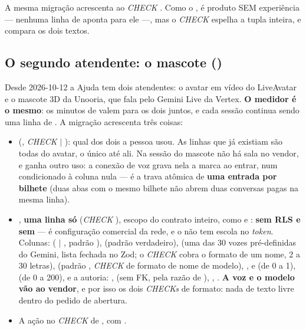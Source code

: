 A mesma migração acrescenta  ao \emph{CHECK}
. Como o , é produto SEM
experiência --- nenhuma linha de  aponta para ele ---, mas o
\emph{CHECK} espelha a tupla  inteira, e
 compara os dois textos.

\subsection{O segundo atendente: o mascote ()}

Desde 2026-10-12 a Ajuda tem dois atendentes: o avatar em vídeo do LiveAvatar e
o mascote 3D da Unooria, que fala pelo Gemini Live da Vertex. \textbf{O medidor é
o mesmo}: os minutos de  valem para os dois juntos, e cada
sessão continua sendo uma linha de . A migração
 acrescenta três coisas:

\begin{itemize}
  \item \textbf{} (, \emph{CHECK}  $|$ ): qual dos dois a
    pessoa usou. As linhas que já existiam são todas do avatar, o único até ali.
    Na sessão do mascote não há sala no vendor, e 
    ganha outro uso: a conexão de voz grava nela a marca
     ao entrar, num  condicionado à coluna nula
    --- é a trava atômica de \textbf{uma entrada por bilhete} (duas abas com o
    mesmo bilhete não abrem duas conversas pagas na mesma linha).
  \item \textbf{}, \textbf{uma linha só} (\emph{CHECK}
    ), escopo do contrato inteiro, como  e
    : \textbf{sem RLS e sem } --- é
    configuração comercial da rede, e o  não tem escola no
    \emph{token}. Colunas:  ( $|$
    , padrão ),  (padrão
    verdadeiro),  (uma das 30 vozes pré-definidas do Gemini,
    lista fechada no Zod; o \emph{CHECK} cobra o formato de um nome, 2 a 30
    letras),  (padrão , \emph{CHECK} de
    formato de nome de modelo), ,
     e  (de 0 a 1),
     (de 0 a 200), e a autoria: ,
     (sem FK, pela razão de ),
    , . \textbf{A voz e o modelo vão ao
    vendor}, e por isso os dois \emph{CHECKs} de formato: nada de texto livre
    dentro do pedido de abertura.
  \item A ação  no \emph{CHECK} de
    , com  .
\end{itemize}

